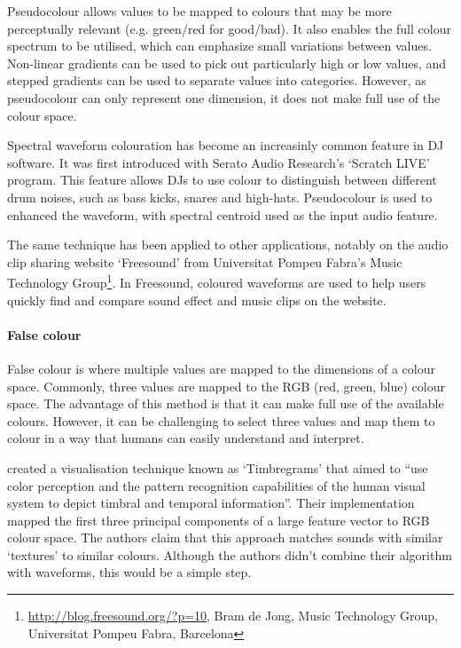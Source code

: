 Pseudocolour allows values to be mapped to colours that may be more perceptually relevant (e.g. green/red for
good/bad).  It also enables the full colour spectrum to be utilised, which can emphasize small variations between
values.  Non-linear gradients can be used to pick out particularly high or low values, and stepped gradients can be
used to separate values into categories.  However, as pseudocolour can only represent one dimension, it does not make
full use of the colour space.

Spectral waveform colouration has become an increasinly common feature in DJ software. It was first introduced with
Serato Audio Research's `Scratch LIVE' program.
This feature allows DJs to use colour to distinguish between different drum noises, such as bass kicks, snares and
high-hats. Pseudocolour is used to enhanced the waveform, with spectral centroid used as the input audio feature.

The same technique has been applied to other applications, notably on the audio clip sharing website `Freesound' from
Universitat Pompeu Fabra's Music Technology Group\footnote{\url{http://blog.freesound.org/?p=10}, Bram de Jong, Music
  Technology Group, Universitat Pompeu Fabra, Barcelona}. In Freesound, coloured waveforms are used to help users
quickly find and compare sound effect and music clips on the website.

\paragraph{False colour}\label{sec:background-falsecolour}
False colour is where multiple values are mapped to the dimensions of a colour space. Commonly, three values are
mapped to the RGB (red, green, blue) colour space.  The advantage of this method is that it can make full use of the
available colours.  However, it can be challenging to select three values and map them to colour in a way that humans
can easily understand and interpret.

\citet{Tzanetakis2000} created a visualisation technique known as `Timbregrams' that aimed to ``use color perception
and the pattern recognition capabilities of the human visual system to depict timbral and temporal information''. Their
implementation mapped the first three principal components of a large feature vector to RGB colour space. The authors
claim that this approach matches sounds with similar `textures' to similar colours.
Although the authors didn't combine their algorithm with waveforms, this would be a simple step.

